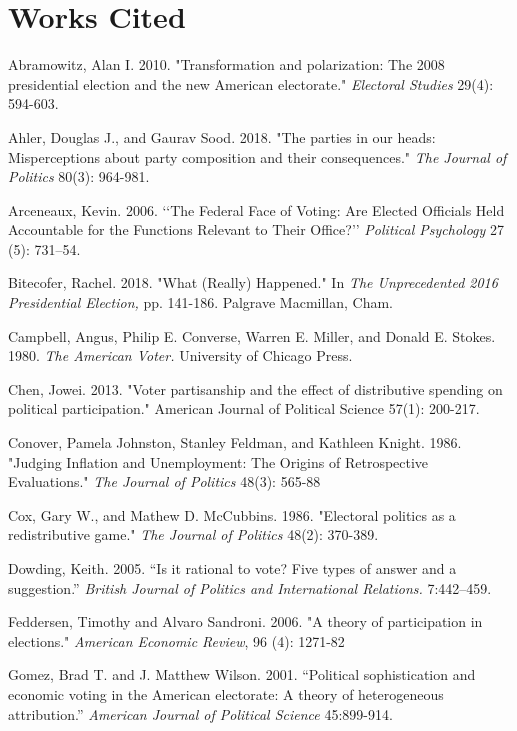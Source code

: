 \documentclass[12pt]{paper}
\begin{document}
\section*{Works Cited}
\singlespace 
\begin{hangparas}{.25in}{1}

Abramowitz, Alan I. 2010. "Transformation and polarization: The 2008 presidential election and the new American electorate." \textit{Electoral Studies} 29(4): 594-603.

Ahler, Douglas J., and Gaurav Sood. 2018. "The parties in our heads: Misperceptions about party composition and their consequences." \textit{The Journal of Politics} 80(3): 964-981.

Arceneaux, Kevin. 2006. ‘‘The Federal Face of Voting: Are Elected Officials Held Accountable for the Functions Relevant to Their Office?’’ \textit{Political Psychology} 27 (5): 731–54.

Bitecofer, Rachel. 2018. "What (Really) Happened." In \textit{The Unprecedented 2016 Presidential Election,} pp. 141-186. Palgrave Macmillan, Cham.

Campbell, Angus, Philip E. Converse, Warren E. Miller, and Donald E. Stokes. 1980. \textit{The American Voter.} University of Chicago Press.

Chen, Jowei. 2013. "Voter partisanship and the effect of distributive spending on political participation." American Journal of Political Science 57(1): 200-217.

Conover, Pamela Johnston, Stanley Feldman, and Kathleen Knight. 1986. "Judging Inflation and Unemployment: The Origins of Retrospective Evaluations." \textit{The Journal of Politics} 48(3): 565-88

Cox, Gary W., and Mathew D. McCubbins. 1986. "Electoral politics as a redistributive game." \textit{The Journal of Politics} 48(2): 370-389.

Dowding, Keith. 2005. “Is it rational to vote? Five types of answer and a suggestion.” \textit{British Journal of Politics and International Relations.} 7:442–459.

Feddersen, Timothy and Alvaro Sandroni. 2006. "A theory of participation in elections." \textit{American Economic Review}, 96 (4): 1271-82

Gomez, Brad T. and J. Matthew Wilson. 2001. “Political sophistication and economic voting in the American electorate: A theory of heterogeneous attribution.” \textit{American Journal of Political Science} 45:899-914.


\end{hangparas}
\end{document}
